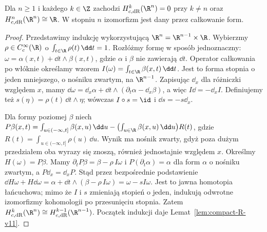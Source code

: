 \begin{twierdzenie}
\label{thm:compact-Rn-v11}
Dla $n\ge1$ i każdego $k\in\Z$ zachodzi
$H_{c,\mathrm{dR}}^k(\R^n)=0$ przy $k\ne n$ oraz
$H_{c,\mathrm{dR}}^n(\R^n)\cong\R$.
W stopniu $n$ izomorfizm jest dany przez całkowanie form.
\end{twierdzenie}
\begin{proof}
Przedstawimy indukcję wykorzystującą $\R^n=\R^{n-1}\times\R$.
Wybierzmy $\rho\in C_c^\infty(\R)$ o
$\int_{t\in\R}\rho(t)\,\dd t=1$.
Rozłóżmy formę w sposób jednoznaczny:
$\omega=\alpha(x,t)+\dd t\wedge\beta(x,t)$,
gdzie $\alpha$ i $\beta$ nie zawierają $\dd t$.
Operator całkowania po włóknie określamy wzorem
$I(\omega)=\int_{t\in\R}\beta(x,t)\,\dd t$.
Jest to forma stopnia o jeden mniejszego, o nośniku zwartym,
na $\R^{n-1}$. Zapisując $\dd_x$ dla różniczki względem $x$,
mamy
$\dd\omega=\dd_x\alpha+\dd t\wedge
(\partial_t\alpha-\dd_x\beta)$, a więc
$I\dd=-\dd_x I$. Definiujemy też
$s(\eta)=\rho(t)\,\dd t\wedge\eta$;
wówczas $I\circ s=\id$ i $\dd s=-s\dd_x$.

Dla formy poziomej $\beta$ niech
$P\beta(x,t)=\int_{u\in(-\infty,t]}\beta(x,u)\,\dd u-
\bigl(\int_{u\in\R}\beta(x,u)\,\dd u\bigr)R(t)$,
gdzie $R(t)=\int_{u\in(-\infty,t]}\rho(u)\,\dd u$.
Wynik ma nośnik zwarty, gdyż poza dużym przedziałem
oba wyrazy się znoszą, również jednostajnie względem $x$.
Określmy $H(\omega)=P\beta$. Mamy
$\partial_t P\beta=\beta-\rho\,I\omega$ i
$P(\partial_t\alpha)=\alpha$ dla form $\alpha$ o
nośniku zwartym, a $P\dd_x=\dd_xP$.
Stąd przez bezpośrednie podstawienie
$\dd H\omega+H\dd\omega=
\alpha+\dd t\wedge(\beta-\rho\,I\omega)
=\omega-sI\omega$.
Jest to jawna homotopia łańcuchowa; mimo że $I$ i $s$
zmieniają stopień o jeden, indukują odwrotne
izomorfizmy kohomologii po przesunięciu stopnia. Zatem
$H_{c,\mathrm{dR}}^k(\R^n)\cong
H_{c,\mathrm{dR}}^{k-1}(\R^{n-1})$.
Początek indukcji daje Lemat~\ref{lem:compact-R-v11}.
\end{proof}

